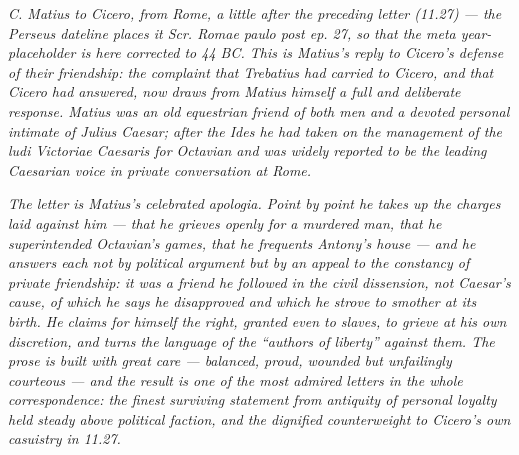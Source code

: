 
\textit{C. Matius to Cicero, from Rome, a little after
the preceding letter (11.27) --- the Perseus dateline
places it \textit{Scr. Romae paulo post ep. 27}, so that
the meta year-placeholder is here corrected to 44 BC. This
is Matius's reply to Cicero's defense of their friendship:
the complaint that Trebatius had carried to Cicero, and
that Cicero had answered, now draws from Matius himself a
full and deliberate response. Matius was an old equestrian
friend of both men and a devoted personal intimate of
Julius Caesar; after the Ides he had taken on the
management of the \textit{ludi Victoriae Caesaris} for
Octavian and was widely reported to be the leading
Caesarian voice in private conversation at Rome.}

\textit{The letter is Matius's celebrated apologia. Point
by point he takes up the charges laid against him --- that
he grieves openly for a murdered man, that he superintended
Octavian's games, that he frequents Antony's house --- and
he answers each not by political argument but by an appeal
to the constancy of private friendship: it was a friend he
followed in the civil dissension, not Caesar's cause, of
which he says he disapproved and which he strove to smother
at its birth. He claims for himself the right, granted even
to slaves, to grieve at his own discretion, and turns the
language of the ``authors of liberty'' against them. The
prose is built with great care --- balanced, proud,
wounded but unfailingly courteous --- and the result is one
of the most admired letters in the whole correspondence:
the finest surviving statement from antiquity of personal
loyalty held steady above political faction, and the
dignified counterweight to Cicero's own casuistry in
11.27.}
